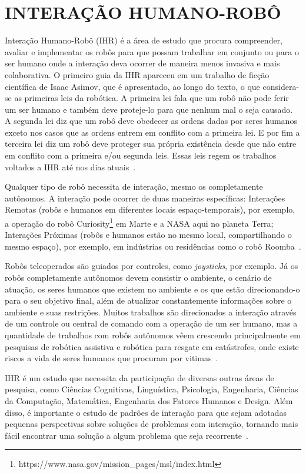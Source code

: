 \chapter{INTERAÇÃO HUMANO-ROBÔ}
\label{cap:ihr}
Interação Humano-Robô (IHR) é a área de estudo que procura compreender, avaliar e implementar os robôs para que possam trabalhar em conjunto ou para o ser humano onde a interação deva ocorrer de maneira menos invasiva e mais colaborativa. O primeiro guia da IHR apareceu em um trabalho de ficção científica de Isaac Asimov, que é apresentado, ao longo do texto, o que considera-se as primeiras leis da robótica. A primeira lei fala que um robô não pode ferir um ser humano e também deve proteje-lo para que nenhum mal o seja causado. A segunda lei diz que um robô deve obedecer as ordens dadas por seres humanos exceto nos casos que as ordens entrem em conflito com a primeira lei. E por fim a terceira lei diz um robô deve proteger sua própria existência desde que não entre em conflito com a primeira e/ou segunda leis. Essas leis regem os trabalhos voltados a IHR até nos dias atuais~\cite{Goodrich:2007, Weiss:2010}.

Qualquer tipo de robô necessita de interação, mesmo os completamente autônomos. A interação pode ocorrer de duas maneiras específicas: Interações Remotas (robôs e humanos em diferentes locais espaço-temporais), por exemplo, a operação do robô Curiosity\footnote{https://www.nasa.gov/mission\_pages/msl/index.html} em Marte e a NASA aqui no planeta Terra; Interações Próximas (robôs e humanos estão no mesmo local, compartilhando o mesmo espaço), por exemplo, em indústrias ou residências como o robô Roomba~\cite{Goodrich:2007}.

Robôs teleoperados são guiados por controles, como \emph{joysticks}, por exemplo. Já os robôs completamente autônomos devem consistir o ambiente, o cenário de atuação, os seres humanos que existem no ambiente e os que estão direcionando-o para o seu objetivo final, além de atualizar constantemente informações sobre o ambiente e suas restrições. Muitos trabalhos são direcionados a interação através de um controle ou central de comando com a operação de um ser humano, mas a quantidade de trabalhos com robôs autônomos vêem crescendo principalmente em pesquisas de robótica assistiva e robótica para resgate em catástrofes, onde existe riscos a vida de seres humanos que procuram por vitimas~\cite{Goodrich:2007, Weiss:2010}.

IHR é um estudo que necessita da participação de diversas outras áreas de pesquisa, como Ciências Cognitivas, Linguística, Psicologia, Engenharia, Ciências da Computação, Matemática, Engenharia dos Fatores Humanos e Design. Além disso, é importante o estudo de padrões de interação para que sejam adotadas pequenas perspectivas sobre soluções de problemas com interação, tornando mais fácil encontrar uma solução a algum problema que seja recorrente~\cite{Goodrich:2007}.

